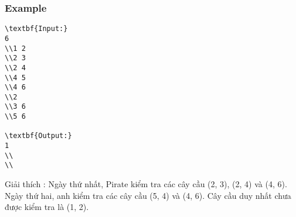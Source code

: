 \subsubsection{   Example  }
\begin{verbatim}
\textbf{Input:}
6
\\1 2
\\2 3
\\2 4
\\4 5
\\4 6
\\2
\\3 6
\\5 6

\textbf{Output:}
1
\\
\\\end{verbatim}

Giải thích        : Ngày thứ nhất, Pirate kiểm tra các cây cầu (2, 3), (2, 4) và (4, 6). Ngày thứ hai, anh kiểm tra các cây cầu (5, 4) và (4, 6). Cây cầu duy nhất chưa được kiểm tra là (1, 2).
